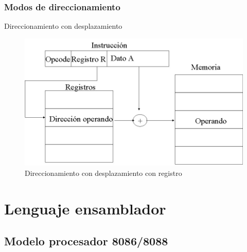 \documentclass{beamer}
\begin{document}
\begin{frame}
	\frametitle{Modos de direccionamiento}
	\begin{block}{Direccionamiento con desplazamiento} 
	\begin{figure}[H]
	\centering
	\includegraphics[scale=0.4]{imagenes/desplazamientoRegistro.jpg}
	\caption{Direccionamiento con desplazamiento con registro}
	\end{figure}			
	\end{block}		 		
\end{frame}


\section{Lenguaje ensamblador}

\subsection{Modelo procesador 8086/8088}
\end{document}
